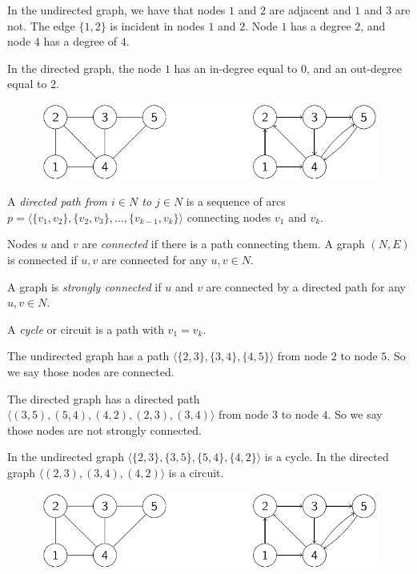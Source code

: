 \documentclass[12pt, a4paper]{report}
\begin{document}
    \begin{example}

        In the undirected graph, we have that nodes $1$ and $2$ are adjacent and $1$ and $3$ are not. The edge $\{1,2\}$ is incident in nodes $1$ and $2$. Node $1$ has a degree $2$,
        and node $4$ has a degree of $4$. 

        In the directed graph, the node $1$ has an in-degree equal to $0$, and an out-degree equal to $2$.
        \begin{figure}[H]
            \centering
            \includegraphics[width=0.75\linewidth]{images/graph.png}
        \end{figure}
    \end{example}
    \begin{definition}
        A \emph{directed path from $i \in N$ to $j \in N$} is a sequence of arcs $p=\langle \{v_1,v_2\},\{v_2,v_3\},\dots,\{v_{k-1},v_k\}\rangle $ connecting nodes $v_1$ and $v_k$.

        Nodes $u$ and $v$ are \emph{connected} if there is a path connecting them. A graph $(N,E)$ is connected if $u,v$ are connected for any $u,v \in N$. 
        
        A graph is \emph{strongly connected} if $u$ and $v$ are connected by a directed path for any $u,v \in N$. 
        
        A \emph{cycle} or circuit is a path with $v_1=v_k$.
    \end{definition}
    \begin{example}
        The undirected graph has a path $\langle \{2,3\},\{3,4\},\{4,5\}\rangle$ from node $2$ to node $5$. So we say those nodes are connected. 
        
        The directed graph has a directed path $\langle (3,5),(5,4),(4,2),(2,3),(3,4) \rangle$ from node $3$ to node $4$. So we say those nodes are not strongly connected. 
        
        In the undirected graph $\langle \{2,3\},\{3,5\},\{5,4\},\{4,2\}\rangle$ is a cycle. 
        In the directed graph $\langle (2,3),(3,4),(4,2) \rangle$ is a circuit. 
        \begin{figure}[H]
            \centering
            \includegraphics[width=0.75\linewidth]{images/graph.png}
        \end{figure}
    \end{example}
\end{document}
